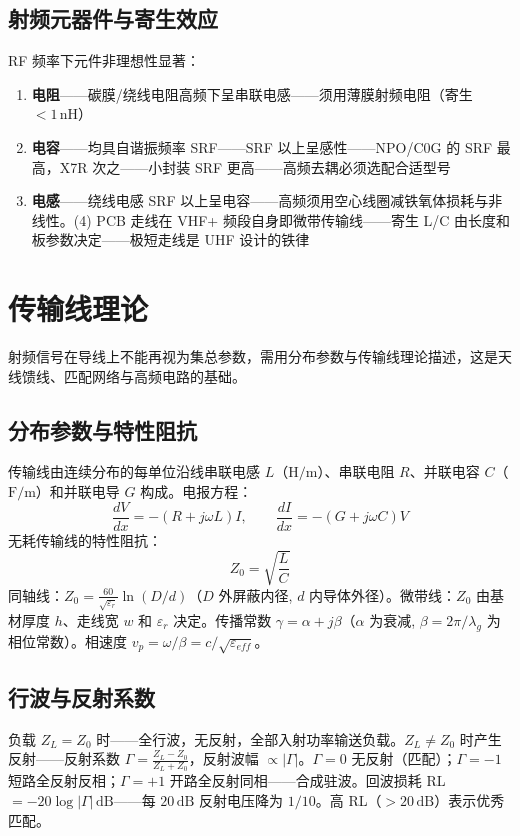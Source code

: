 \documentclass[12pt,UTF8]{ctexbook}
\begin{document}
\subsection{射频元器件与寄生效应}

RF 频率下元件非理想性显著：
\begin{enumerate}
\item \textbf{电阻}——碳膜/绕线电阻高频下呈串联电感——须用薄膜射频电阻（寄生 $<1\,\mathrm{nH}$）
\item \textbf{电容}——均具自谐振频率 SRF——SRF 以上呈感性——NPO/C0G 的 SRF 最高，X7R 次之——小封装 SRF 更高——高频去耦必须选配合适型号
\item \textbf{电感}——绕线电感 SRF 以上呈电容——高频须用空心线圈减铁氧体损耗与非线性。(4) PCB 走线在 VHF+ 频段自身即微带传输线——寄生 L/C 由长度和板参数决定——极短走线是 UHF 设计的铁律
\end{enumerate}

\section{传输线理论}
\label{sec:transmission_line_theory}

射频信号在导线上不能再视为集总参数，需用分布参数与传输线理论描述，这是天线馈线、匹配网络与高频电路的基础。

\subsection{分布参数与特性阻抗}

传输线由连续分布的每单位沿线串联电感 $L$（$\mathrm{H/m}$）、串联电阻 $R$、并联电容 $C$（$\mathrm{F/m}$）和并联电导 $G$ 构成。电报方程：
\[
\frac{dV}{dx} = -(R+j\omega L)I,\qquad \frac{dI}{dx} = -(G+j\omega C)V
\]
无耗传输线的特性阻抗：
\[
\boxed{Z_0 = \sqrt{\frac{L}{C}}}
\]
同轴线：$Z_0 = \frac{60}{\sqrt{\varepsilon_r}}\ln(D/d)$（$D$ 外屏蔽内径, $d$ 内导体外径）。微带线：$Z_0$ 由基材厚度 $h$、走线宽 $w$ 和 $\varepsilon_r$ 决定。传播常数 $\gamma=\alpha+j\beta$（$\alpha$ 为衰减, $\beta=2\pi/\lambda_g$ 为相位常数）。相速度 $v_p=\omega/\beta = c/\sqrt{\varepsilon_{eff}}$。

\subsection{行波与反射系数}

负载 $Z_L=Z_0$ 时——全行波，无反射，全部入射功率输送负载。$Z_L \neq Z_0$ 时产生反射——反射系数 $\Gamma = \frac{Z_L-Z_0}{Z_L+Z_0}$，反射波幅 $\propto|\Gamma|$。$\Gamma=0$ 无反射（匹配）；$\Gamma=-1$ 短路全反射反相；$\Gamma=+1$ 开路全反射同相——合成驻波。回波损耗 RL $=-20\log|\Gamma|\,\mathrm{dB}$——每 $20\,\mathrm{dB}$ 反射电压降为 $1/10$。高 RL（$>20\,\mathrm{dB}$）表示优秀匹配。
\end{document}
